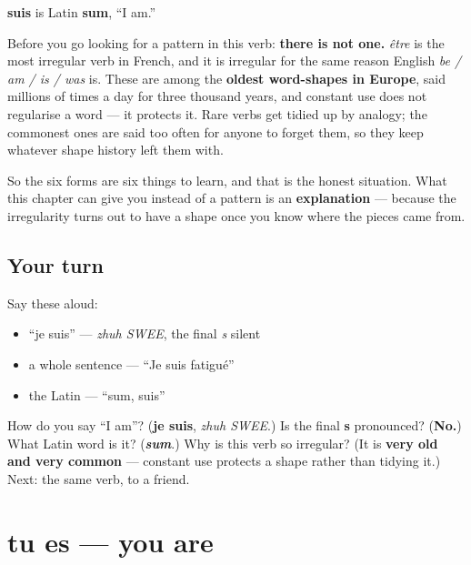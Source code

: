 \begin{cousinweb}
\textbf{suis} is Latin \textbf{sum}, \textquotedblleft{}I am.\textquotedblright{}

Before you go looking for a pattern in this verb: \textbf{there is not one.} \emph{être} is the most irregular verb in French, and it is irregular for the same reason English \emph{be / am / is / was} is. These are among the \textbf{oldest word-shapes in Europe}, said millions of times a day for three thousand years, and constant use does not regularise a word — it protects it. Rare verbs get tidied up by analogy; the commonest ones are said too often for anyone to forget them, so they keep whatever shape history left them with.

So the six forms are six things to learn, and that is the honest situation. What this chapter can give you instead of a pattern is an \textbf{explanation} — because the irregularity turns out to have a shape once you know where the pieces came from.
\end{cousinweb}

\subsection*{Your turn}
Say these aloud:

\begin{itemize}
\raggedright
  \item \textquotedblleft{}je suis\textquotedblright{} — \emph{zhuh SWEE}, the final \emph{s} silent
  \item a whole sentence — \textquotedblleft{}Je suis fatigué\textquotedblright{}
  \item the Latin — \textquotedblleft{}sum, suis\textquotedblright{}
\end{itemize}

\begin{tcolorbox}[breakable,colback=teal!4,colframe=teal!35!black,title={Before you move on}]
How do you say \textquotedblleft{}I am\textquotedblright{}? (\textbf{je suis}, \emph{zhuh SWEE}.) Is the final \textbf{s} pronounced? (\textbf{No.}) What Latin word is it? (\emph{\textbf{sum}}.) Why is this verb so irregular? (It is \textbf{very old and very common} — constant use protects a shape rather than tidying it.) Next: the same verb, to a friend.
\end{tcolorbox}
\section[tu es]{tu es — you are}

